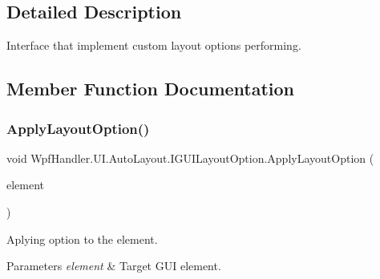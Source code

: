 \subsection{Detailed Description}
Interface that implement custom layout options performing. 



\subsection{Member Function Documentation}
\mbox{\label{interface_wpf_handler_1_1_u_i_1_1_auto_layout_1_1_i_g_u_i_layout_option_ac2d2fa8aeaf753b3248381399f991005}} 
\subsubsection{\texorpdfstring{Apply\+Layout\+Option()}{ApplyLayoutOption()}}
{\footnotesize\ttfamily void Wpf\+Handler.\+U\+I.\+Auto\+Layout.\+I\+G\+U\+I\+Layout\+Option.\+Apply\+Layout\+Option (\begin{DoxyParamCaption}\item[{Framework\+Element}]{element }\end{DoxyParamCaption})}



Aplying option to the element. 


\begin{DoxyParams}{Parameters}
{\em element} & Target G\+UI element.\\
\hline
\end{DoxyParams}


